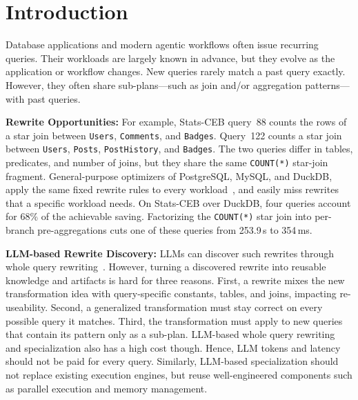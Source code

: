 \section{Introduction}
\label{sec:introduction}

Database applications and modern agentic workflows often issue recurring queries.
Their workloads are largely known in advance, but they evolve as the application or workflow changes.
New queries rarely match a past query exactly.
However, they often share sub-plans---such as join and/or aggregation patterns---with past queries.

\textbf{Rewrite Opportunities:} For example, Stats-CEB query~88 counts the rows of a star join between \texttt{Users}, \texttt{Comments}, and \texttt{Badges}.
Query~122 counts a star join between \texttt{Users}, \texttt{Posts}, \texttt{PostHistory}, and \texttt{Badges}.
The two queries differ in tables, predicates, and number of joins, but they share the same \texttt{COUNT(*)} star-join fragment.
General-purpose optimizers of PostgreSQL, MySQL, and DuckDB, apply the same fixed rewrite rules to every workload~\cite{PiraheshHH92, Calcite}, and easily miss rewrites that a specific workload needs. On Stats-CEB over DuckDB, four queries account for 68\% of the achievable saving.
Factorizing the \texttt{COUNT(*)} star join into per-branch pre-aggregations cuts one of these queries from 253.9\,s to 354\,ms.


\textbf{LLM-based Rewrite Discovery:} LLMs can discover such rewrites through whole query rewriting~\cite{resequel}.
However, turning a discovered rewrite into reusable knowledge and artifacts is hard for three reasons.
First, a rewrite mixes the new transformation idea with query-specific constants, tables, and joins, impacting re-useability.
Second, a generalized transformation must stay correct on every possible query it matches.
Third, the transformation must apply to new queries that contain its pattern only as a sub-plan.
%
LLM-based whole query rewriting and specialization also has a high cost though.
Hence, LLM tokens and latency should not be paid for every query. Similarly, LLM-based specialization should not replace existing execution engines, but reuse well-engineered components such as parallel execution and memory management.





